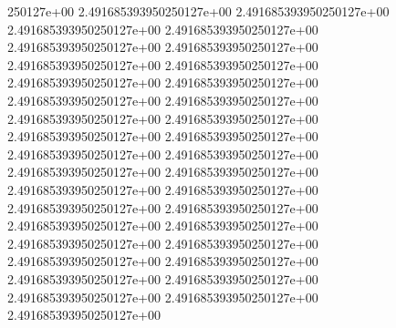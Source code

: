 250127e+00	2.491685393950250127e+00	2.491685393950250127e+00	2.491685393950250127e+00	2.491685393950250127e+00	2.491685393950250127e+00	2.491685393950250127e+00	2.491685393950250127e+00	2.491685393950250127e+00	2.491685393950250127e+00	2.491685393950250127e+00	2.491685393950250127e+00	2.491685393950250127e+00	2.491685393950250127e+00	2.491685393950250127e+00	2.491685393950250127e+00	2.491685393950250127e+00	2.491685393950250127e+00	2.491685393950250127e+00	2.491685393950250127e+00	2.491685393950250127e+00	2.491685393950250127e+00	2.491685393950250127e+00	2.491685393950250127e+00	2.491685393950250127e+00	2.491685393950250127e+00	2.491685393950250127e+00	2.491685393950250127e+00	2.491685393950250127e+00	2.491685393950250127e+00	2.491685393950250127e+00	2.491685393950250127e+00	2.491685393950250127e+00	2.491685393950250127e+00	2.491685393950250127e+00	2.491685393950250127e+00
